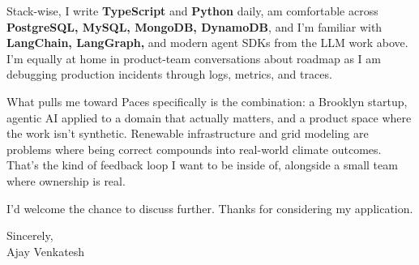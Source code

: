 \documentclass[letterpaper,11pt]{article}
\begin{document}
Stack-wise, I write \textbf{TypeScript} and \textbf{Python} daily, am comfortable across \textbf{PostgreSQL, MySQL, MongoDB, DynamoDB}, and I'm familiar with \textbf{LangChain, LangGraph,} and modern agent SDKs from the LLM work above. I'm equally at home in product-team conversations about roadmap as I am debugging production incidents through logs, metrics, and traces.

What pulls me toward Paces specifically is the combination: a Brooklyn startup, agentic AI applied to a domain that actually matters, and a product space where the work isn't synthetic. Renewable infrastructure and grid modeling are problems where being correct compounds into real-world climate outcomes. That's the kind of feedback loop I want to be inside of, alongside a small team where ownership is real.

I'd welcome the chance to discuss further. Thanks for considering my application.

\vspace{12pt}

Sincerely, \\
Ajay Venkatesh
\end{document}
